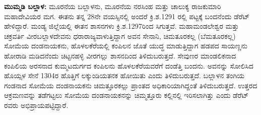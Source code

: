 \textbf{ಮುಮ್ಮಡಿ ಬಲ್ಲಾಳ: } ಮೂರನೆಯ ಬಲ್ಲಾಳನು, ಮೂರನೆಯ ನರಸಿಂಹ ಮತ್ತು ಚಾಲುಕ್ಯ ರಾಜಕುಮಾರಿ ಮಹಾದೇವಿಯರ ಮಗ. ಈತನು ತನ್ನ 28ನೇ ವಯಸ್ಸಿನಲ್ಲಿ ಅಂದರೆ ಕ್ರಿ.ಶ.1291 ರಲ್ಲಿ ಪಟ್ಟಕ್ಕೆ ಬಂದನೆಂದು ಡೆರೆಟ್​ ಹೇಳಿದ್ದಾರೆ. ಮಂಡ್ಯ ಜಿಲ್ಲೆಯಲ್ಲಿ ಈತನ ಶಾಸನಗಳು ಕ್ರಿ.ಶ.1297ರಿಂದ ಸಿಗುತ್ತವೆ. ಮಹಾಮಂಡಲೇಶ್ವರ ಮತ್ತು ಚಕ್ರವರ್ತಿ ವೀರಬಲ್ಲಾಳದೇವನು ಧರಾರಾಜ್ಯವಾಳುತ್ತಿದ್ದಾಗ ಅವನ ಸೇನಾನಿ, ಚಿಮತೂರಕಲ್ಲ (ಬೆಮತೂರಕಲ್ಲ) ಸೋಮೆಯ ದಂಡನಾಯಕನು, ಹೊಳಲಕೆರೆಯಲ್ಲಿ ಕಂಪಿಲನ ಜೊತೆ ಯುದ್ಧ ಮಾಡುತ್ತಿದ್ದಾಗ ಹಡಪದ ಸಾಯಣ್ಣನು ಹೋರಾಡಿ ಮಡಿದನೆಂದು ಚಿಟ್ಟನಹಳ್ಳಿ ವೀರಗಲ್ಲು ಶಾಸನದಿಂದ ತಿಳಿದುಬರುತ್ತದೆ. ಸೇವುಣರ ಮಾಂಡಲಿಕನಾದ ಕಂಪಿಲಿಯ ಅರಸನಾದ ಕುಮ್ಮಟದುರ್ಗದ ಕಂಪಿಲನು ಹೊಳಲಕೆರೆಯವರೆಗೆ ದಂಡೆತ್ತಿ ಬಂದನು. ಅವನನ್ನು ಸೋಲಿಸಿದ ಹೊಯ್ಸಳ ಸೇನೆ 1304ರ ಹೊತ್ತಿಗೆ ಲಕ್ಕುಂಡಿಯತನಕ ಹೋಯಿತು ಎಂದು ತಿಳಿದುಬರುತ್ತದೆ. ಬಲ್ಲಾಳನ ತಂಗಿಯ ಗಂಡನಾದ ಸೋಮೆಯ ದಂಡನಾಯಕನು ಚಿಮತ್ತೂರಕಲ್ಲು ಪ್ರಾಂತದ ಅಧಿಕಾರಿಯಾಗಿದ್ದಂತೆ ತಿಳಿದುಬರುತ್ತದೆ. ಉತ್ತರದ ಆಕ್ರಮಣವನ್ನು ತಡೆಗಟ್ಟಲು ಸೋಮೆಯ ದಂಡನಾಯಕನನ್ನು ಚಿಮ್ಮತ್ತೂರು ಕಲ್ಲಿನಲ್ಲಿ ಇರಿಸಲಾಗಿತ್ತು ಎಂದು ಡೆರೆಟ್​ರವರು ಅಭಿಪ್ರಾಯಪಟ್ಟಿದ್ದಾರೆ.

\newpage

